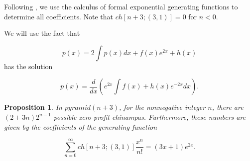 \documentclass[a4paper]{article}\usepackage[english]{babel}
\newtheorem{proposition}[theorem]{Proposition}
\theoremstyle{definition}
\newcommand{\apyr}[1][l]{\ensuremath{pyramid(#1)}}
\newcommand{\chin}[2][n]{\ensuremath{ch[#1;#2]}}
\begin{document}
Following \cite{gf}, we use the calculus of formal exponential generating functions to determine all coefficients. Note that $\chin[n+3]{(3,1)}=0$ for $n<0$.

 We will use the fact that
 
\begin{equation*}
p(x)=2\int p(x)dx+f(x)e^{2x}+h(x)
\end{equation*}
has the solution

\begin{equation}
p(x)= \frac{d}{dx} \left(e^{2x}\int f(x) +h(x)e^{-2x} dx\right)\label{eq:sol}.
\end{equation}

\begin{proposition}
\label{lemma:zero} In $\apyr[n+3]$, for the nonnegative integer $n$, there are $(2+3n) 2^{n-1}$ possible zero-profit chinampas. Furthermore, these numbers are given by the coefficients of the generating function


\begin{equation*}
\sum_{n=0}^\infty \chin[n+3]{(3,1)}\frac{x^n}{n!}=(3x+1)e^{2x}.    
\end{equation*}
\end{proposition}
\end{document}
